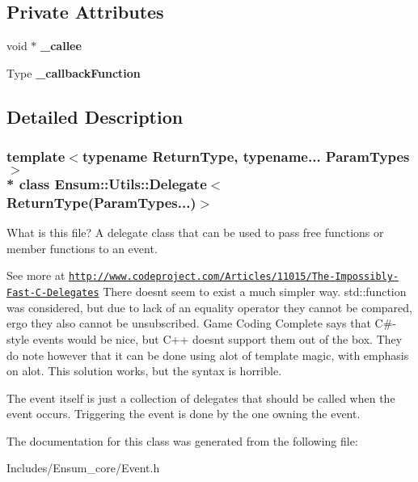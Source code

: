 \subsection*{Private Attributes}
\begin{DoxyCompactItemize}
\item 
void $\ast$ {\bfseries \+\_\+callee}\hypertarget{class_ensum_1_1_utils_1_1_delegate_3_01_return_type_07_param_types_8_8_8_08_4_a332b8802a2968a6d5f30ea49194f666c}{}\label{class_ensum_1_1_utils_1_1_delegate_3_01_return_type_07_param_types_8_8_8_08_4_a332b8802a2968a6d5f30ea49194f666c}

\item 
Type {\bfseries \+\_\+callback\+Function}\hypertarget{class_ensum_1_1_utils_1_1_delegate_3_01_return_type_07_param_types_8_8_8_08_4_a31d7af1a08f4a32e3cb8a065de77d743}{}\label{class_ensum_1_1_utils_1_1_delegate_3_01_return_type_07_param_types_8_8_8_08_4_a31d7af1a08f4a32e3cb8a065de77d743}

\end{DoxyCompactItemize}


\subsection{Detailed Description}
\subsubsection*{template$<$typename Return\+Type, typename... Param\+Types$>$\\*
class Ensum\+::\+Utils\+::\+Delegate$<$ Return\+Type(\+Param\+Types...)$>$}

What is this file? A delegate class that can be used to pass free functions or member functions to an event. 

See more at \href{http://www.codeproject.com/Articles/11015/The-Impossibly-Fast-C-Delegates}{\tt http\+://www.\+codeproject.\+com/\+Articles/11015/\+The-\/\+Impossibly-\/\+Fast-\/\+C-\/\+Delegates} There doesn\textquotesingle{}t seem to exist a much simpler way. std\+::function was considered, but due to lack of an equality operator they cannot be compared, ergo they also cannot be unsubscribed. Game Coding Complete says that C\#-\/style events would be nice, but C++ doesn\textquotesingle{}t support them out of the box. They do note however that it can be done using alot of template magic, with emphasis on alot. This solution works, but the syntax is horrible.

The event itself is just a collection of delegates that should be called when the event occurs. Triggering the event is done by the one owning the event. 

The documentation for this class was generated from the following file\+:\begin{DoxyCompactItemize}
\item 
Includes/\+Ensum\+\_\+core/Event.\+h\end{DoxyCompactItemize}
